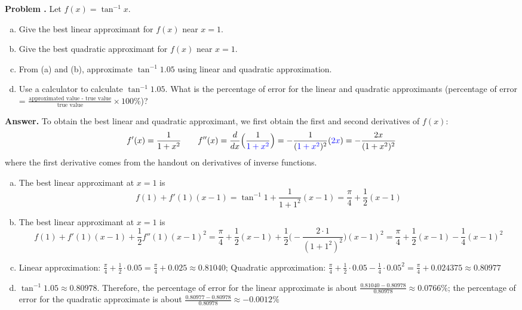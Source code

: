 \documentclass[11pt,letterpaper]{article}
\newcounter{problem}
\newcommand{\problem}{
	\stepcounter{problem}%
	\noindent \textbf{Problem \theproblem. }%
}
\newcommand{\answer}{\noindent \textbf{Answer. }}
\begin{document}
\vspace{6mm}

\problem Let $f(x) = \tan^{-1} x$.
\begin{enumerate}[(a)]
    \item Give the best linear approximant for $f(x)$ near $x = 1$.
    \item Give the best quadratic approximant for $f(x)$ near $x = 1$.
    \item From (a) and (b), approximate $\tan^{-1}1.05$ using linear and quadratic approximation.
    \item Use a calculator to calculate $\tan^{-1} 1.05$.  What is the percentage of error for the linear and quadratic approximants (percentage of error = $\frac{\text{approximated value - true value}}{\text{true value}} \times 100\%$)?
\end{enumerate}\vspace{6mm}

\answer To obtain the best linear and quadratic approximant, we first obtain the first and second derivatives of $f(x)$:
\[f'(x) = \frac{1}{1+x^2} \qquad f''(x) = \frac{d}{dx} \Big(\frac{1}{\textcolor{blue}{1+x^2}}\Big)= -\frac{1}{(\textcolor{blue}{1+x^2})^2}(\textcolor{blue}{2x}) = -\frac{2x}{(1+x^2)^2}\]
where the first derivative comes from the handout on derivatives of inverse functions. 
\begin{enumerate}[(a)]
    \item The best linear approximant at $x=1$ is 
    \[ f(1) + f'(1)(x-1) = \tan^{-1}{1} + \frac{1}{1+1^2}(x-1) = \frac{\pi}{4} + \frac{1}{2}(x-1)\]
    \item The best linear approximant at $x=1$ is 
    \[f(1) + f'(1)(x-1) + \frac{1}{2}f''(1)(x-1)^2 = \frac{\pi}{4} + \frac{1}{2}(x-1) + \frac{1}{2}\Big(-\frac{2 \cdot 1}{(1+1^2)^2}\Big)(x-1)^2 = \frac{\pi}{4} + \frac{1}{2}(x-1) - \frac{1}{4}(x-1)^2\]
    \item Linear approximation: $\frac{\pi}{4} + \frac{1}{2}\cdot 0.05 = \frac{\pi}{4} + 0.025 \approx 0.81040$; Quadratic approximation: $\frac{\pi}{4} + \frac{1}{2}\cdot 0.05 - \frac{1}{4} \cdot 0.05^2 = \frac{\pi}{4} + 0.024375 \approx 0.80977$
    \item $\tan^{-1} 1.05 \approx 0.80978$.  Therefore, the percentage of error for the linear approximate is about $\frac{0.81040-0.80978}{0.80978} \approx 0.0766\%$; the percentage of error for the quadratic approximate is about $\frac{0.80977-0.80978}{0.80978} \approx -0.0012\%$
\end{enumerate}\vspace{6mm}
\end{document}
